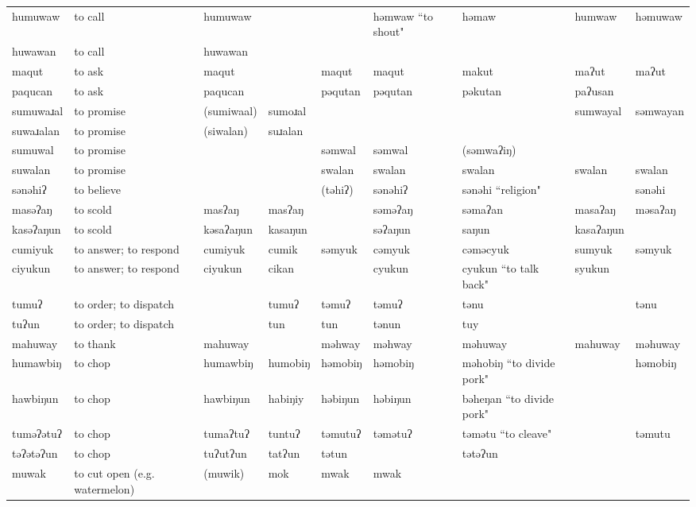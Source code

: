 \begin{landscape}
\begin{longtable}{*{9}{p{}}}
\text{*}humuwaw & to call & humuwaw &  &  & həmwaw ``to shout" & həmaw & humwaw & həmuwaw\\
\text{*}huwawan & to call & huwawan &  &  &  &  &  & \\
\text{*}maqut & to ask & maqut &  & maqut & maqut & makut & maʔut & maʔut\\
\text{*}paqucan & to ask & paqucan &  & pəqutan & pəqutan & pəkutan & paʔusan & \\
\text{*}sumuwaɹal & to promise & (sumiwaal) & sumoɹal &  &  &  & sumwayal & səmwayan\\
\text{*}suwaɹalan & to promise & (siwalan) & suɹalan &  &  &  &  & \\
\text{*}sumuwal & to promise &  &  & səmwal & səmwal & (səmwaʔiŋ) &  & \\
\text{*}suwalan & to promise &  &  & swalan & swalan & swalan & swalan & swalan\\
\text{*}sənəhiʔ & to believe &  &  & (təhiʔ) & sənəhiʔ & sənəhi ``religion" &  & sənəhi\\
\text{*}masəʔaŋ & to scold & masʔaŋ & masʔaŋ &  & səməʔaŋ & səmaʔan & masaʔaŋ & məsaʔaŋ\\
\text{*}kasəʔaŋun & to scold & kəsaʔaŋun & kasaŋun &  & səʔaŋun & saŋun & kasaʔaŋun & \\
\text{*}cumiyuk & to answer; to respond & cumiyuk & cumik & səmyuk & cəmyuk & cəməcyuk & sumyuk & səmyuk\\
\text{*}ciyukun & to answer; to respond & ciyukun & cikan &  & cyukun & cyukun ``to talk back" & syukun & \\
\text{*}tumuʔ & to order; to dispatch &  & tumuʔ & təmuʔ & təmuʔ & tənu &  & tənu\\
\text{*}tuʔun & to order; to dispatch &  & tun & tun & tənun & tuy &  & \\
\text{*}mahuway & to thank & mahuway &  & məhway & məhway & məhuway & mahuway & məhuway\\
\text{*}humawbiŋ & to chop & humawbiŋ & humobiŋ & həmobiŋ & həmobiŋ & məhobiŋ ``to divide pork" &  & həmobiŋ\\
\text{*}hawbiŋun & to chop & hawbiŋun & habiŋiy & həbiŋun & həbiŋun & bəheŋan ``to divide pork" &  & \\
\text{*}tuməʔətuʔ & to chop & tumaʔtuʔ & tuntuʔ & təmutuʔ & təmətuʔ & təmətu ``to cleave" &  & təmutu\\
\text{*}təʔətəʔun & to chop & tuʔutʔun & tatʔun & tətun &  & tətəʔun &  & \\
\text{*}muwak & to cut open (e.g. watermelon) & (muwik) & mok & mwak & mwak &  &  & \\

\end{longtable}
\end{landscape}
